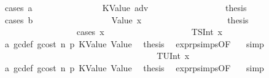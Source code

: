 \begin{isabellebody}
\ {\isacharparenleft}{\kern0pt}cases\ a{\isacharparenright}{\kern0pt}\isanewline
\ \ \ \ \ \ \ \ \ \ \ \ \ \ \isamarkupfalse%
\ {\isacharparenleft}{\kern0pt}KValue\ adv{\isacharparenright}{\kern0pt}\isanewline
\ \ \ \ \ \ \ \ \ \ \ \ \ \ \isamarkupfalse%
\ \isamarkupfalse%
\ {\isacharquery}{\kern0pt}thesis\isanewline
\ \ \ \ \ \ \ \ \ \ \ \ \ \ \isamarkupfalse%
\ {\isacharparenleft}{\kern0pt}cases\ b{\isacharparenright}{\kern0pt}\isanewline
\ \ \ \ \ \ \ \ \ \ \ \ \ \ \ \ \isamarkupfalse%
\ {\isacharparenleft}{\kern0pt}Value\ x{}{\isacharparenright}{\kern0pt}\isanewline
\ \ \ \ \ \ \ \ \ \ \ \ \ \ \ \ \isamarkupfalse%
\ \isamarkupfalse%
\ {\isacharquery}{\kern0pt}thesis\isanewline
\ \ \ \ \ \ \ \ \ \ \ \ \ \ \ \ \isamarkupfalse%
\ {\isacharparenleft}{\kern0pt}cases\ x{}{\isacharparenright}{\kern0pt}\isanewline
\ \ \ \ \ \ \ \ \ \ \ \ \ \ \ \ \ \ \isamarkupfalse%
\ {\isacharparenleft}{\kern0pt}TSInt\ x{}{\isacharparenright}{\kern0pt}\isanewline
\ \ \ \ \ \ \ \ \ \ \ \ \ \ \ \ \ \ \isamarkupfalse%
\ a{}\ gc{\isacharunderscore}{\kern0pt}def\ gcost\ n\ p{}\ KValue\ Value\ \isamarkupfalse%
\ {\isacharquery}{\kern0pt}thesis\ \isamarkupfalse%
\ expr{\isachardot}{\kern0pt}psimps{\isacharparenleft}{\kern0pt}{}{}{\isacharparenright}{\kern0pt}{\isacharbrackleft}{\kern0pt}OF\ {}{}{\isacharparenleft}{\kern0pt}{}{\isacharparenright}{\kern0pt}{\isacharbrackright}{\kern0pt}\ \isamarkupfalse%
\ simp\isanewline
\ \ \ \ \ \ \ \ \ \ \ \ \ \ \ \ \isamarkupfalse%
\isanewline
\ \ \ \ \ \ \ \ \ \ \ \ \ \ \ \ \ \ \isamarkupfalse%
\ {\isacharparenleft}{\kern0pt}TUInt\ x{}{\isacharparenright}{\kern0pt}\isanewline
\ \ \ \ \ \ \ \ \ \ \ \ \ \ \ \ \ \ \isamarkupfalse%
\ a{}\ gc{\isacharunderscore}{\kern0pt}def\ gcost\ n\ p{}\ KValue\ Value\ \isamarkupfalse%
\ {\isacharquery}{\kern0pt}thesis\ \isamarkupfalse%
\ expr{\isachardot}{\kern0pt}psimps{\isacharparenleft}{\kern0pt}{}{}{\isacharparenright}{\kern0pt}{\isacharbrackleft}{\kern0pt}OF\ {}{}{\isacharparenleft}{\kern0pt}{}{\isacharparenright}{\kern0pt}{\isacharbrackright}{\kern0pt}\ \isamarkupfalse%
\ simp\isanewline

\end{isabellebody}
